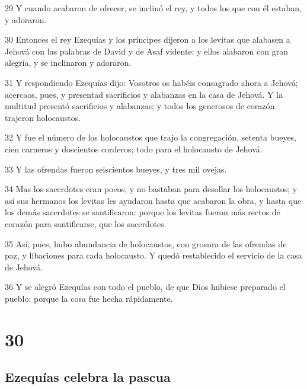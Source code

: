\par 29 Y cuando acabaron de ofrecer, se inclinó el rey, y todos los que con él estaban, y adoraron.
\par 30 Entonces el rey Ezequías y los príncipes dijeron a los levitas que alabasen a Jehová con las palabras de David y de Asaf vidente: y ellos alabaron con gran alegría, y se inclinaron y adoraron.
\par 31 Y respondiendo Ezequías dijo: Vosotros os habéis consagrado ahora a Jehová; acercaos, pues, y presentad sacrificios y alabanzas en la casa de Jehová. Y la multitud presentó sacrificios y alabanzas; y todos los generosos de corazón trajeron holocaustos.
\par 32 Y fue el número de los holocaustos que trajo la congregación, setenta bueyes, cien carneros y doscientos corderos; todo para el holocausto de Jehová.
\par 33 Y las ofrendas fueron seiscientos bueyes, y tres mil ovejas.
\par 34 Mas los sacerdotes eran pocos, y no bastaban para desollar los holocaustos; y así sus hermanos los levitas les ayudaron hasta que acabaron la obra, y hasta que los demás sacerdotes se santificaron: porque los levitas fueron más rectos de corazón para santificarse, que los sacerdotes.
\par 35 Así, pues, hubo abundancia de holocaustos, con grosura de las ofrendas de paz, y libaciones para cada holocausto. Y quedó restablecido el servicio de la casa de Jehová.
\par 36 Y se alegró Ezequías con todo el pueblo, de que Dios hubiese preparado el pueblo; porque la cosa fue hecha rápidamente.

\chapter{30}

\section*{Ezequías celebra la pascua}

